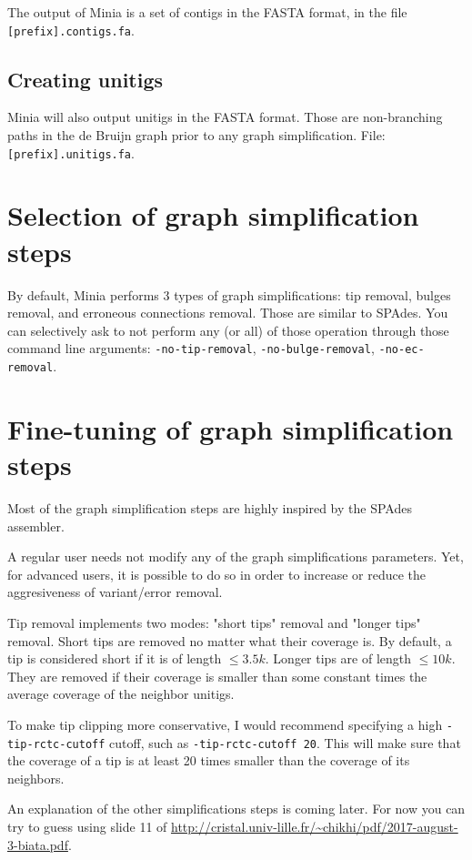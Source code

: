\documentclass[a4paper]{article}
\begin{document}
The output of Minia is a set of contigs in the FASTA format, in the file \verb+[prefix].contigs.fa+. 

\subsection*{Creating unitigs}

Minia will also output unitigs in the FASTA format. Those are non-branching paths in the de Bruijn graph prior to any graph simplification. File: \verb+[prefix].unitigs.fa+. 

\section{Selection of graph simplification steps}

By default, Minia performs 3 types of graph simplifications: tip removal, bulges removal, and erroneous connections removal. Those are similar to SPAdes. You can selectively ask to not perform any (or all) of those operation through those command line arguments: \verb+-no-tip-removal+, \verb+-no-bulge-removal+, \verb+-no-ec-removal+.

\section{Fine-tuning of graph simplification steps}

Most of the graph simplification steps are highly inspired by the SPAdes assembler.

A regular user needs not modify any of the graph simplifications parameters.
Yet, for advanced users, it is possible to do so in order to increase or reduce the aggresiveness of variant/error removal.

Tip removal implements two modes: "short tips" removal and "longer tips" removal. Short tips are removed no matter what their coverage is. By default, a tip is considered short if it is of length $\leq 3.5k$. Longer tips are of length $\leq 10k$. They are removed if their coverage is smaller than some constant times the average coverage of the neighbor unitigs.

To make tip clipping more conservative, I would recommend specifying a high \verb+-tip-rctc-cutoff+ cutoff, such as \verb+-tip-rctc-cutoff 20+. This will make sure that the coverage of a tip is at least 20 times smaller than the coverage of its neighbors.

An explanation of the other simplifications steps is coming later. For now you can try to guess using slide 11 of \url{http://cristal.univ-lille.fr/~chikhi/pdf/2017-august-3-biata.pdf}.
\end{document}
